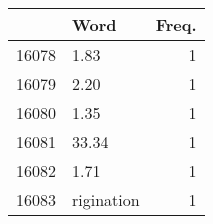 \begin{table}[ht]
\centering
\begin{tabular}{rlr}
  \hline
 & Word & Freq. \\ 
  \hline
16078 & 1.83 & 1 \\ 
  16079 & 2.20 & 1 \\ 
  16080 & 1.35 & 1 \\ 
  16081 & 33.34 & 1 \\ 
  16082 & 1.71 & 1 \\ 
  16083 & rigination & 1 \\ 
   \hline
\end{tabular}
\end{table}
